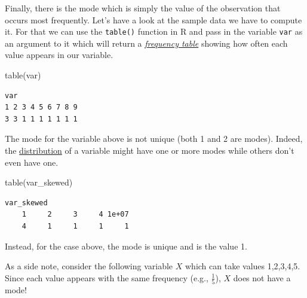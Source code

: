 \documentclass[
  letterpaper,
  DIV=11,
  numbers=noendperiod]{scrartcl}
\newenvironment{Shaded}{\begin{snugshade}}{\end{snugshade}}
\newcommand{\FunctionTok}[1]{\textcolor[rgb]{0.28,0.35,0.67}{#1}}
\newcommand{\NormalTok}[1]{\textcolor[rgb]{0.00,0.23,0.31}{#1}}
\begin{document}
Finally, there is the mode which is simply the value of the observation
that occurs most frequently. Let's have a look at the sample data we
have to compute it. For that we can use the \texttt{table()} function in
R and pass in the variable \texttt{var} as an argument to it which will
return a
\href{https://www.ncl.ac.uk/webtemplate/ask-assets/external/maths-resources/statistics/data-presentation/frequency-distribution-tables.html\#:~:text=A\%20frequency\%20table\%20is\%20a,qualitative\%20or\%20quantitative\%20discrete\%20data.}{\emph{frequency
table}} showing how often each value appears in our variable.

\begin{Shaded}
\begin{Highlighting}[]
\FunctionTok{table}\NormalTok{(var)}
\end{Highlighting}
\end{Shaded}

\begin{verbatim}
var
1 2 3 4 5 6 7 8 9 
3 3 1 1 1 1 1 1 1 
\end{verbatim}

The mode for the variable above is not unique (both 1 and 2 are modes).
Indeed, the
\href{https://aarongullickson.github.io/stat_book/the-distribution-of-a-variable.html}{distribution}
of a variable might have one or more modes while others don't even have
one.

\begin{Shaded}
\begin{Highlighting}[]
\FunctionTok{table}\NormalTok{(var\_skewed)}
\end{Highlighting}
\end{Shaded}

\begin{verbatim}
var_skewed
    1     2     3     4 1e+07 
    4     1     1     1     1 
\end{verbatim}

Instead, for the case above, the mode is unique and is the value 1.

\begin{tcolorbox}[enhanced jigsaw, colbacktitle=quarto-callout-note-color!10!white, coltitle=black, leftrule=.75mm, colback=white, colframe=quarto-callout-note-color-frame, rightrule=.15mm, opacitybacktitle=0.6, titlerule=0mm, arc=.35mm, toptitle=1mm, opacityback=0, bottomtitle=1mm, left=2mm, title=\textcolor{quarto-callout-note-color}{\faInfo}\hspace{0.5em}{Note}, bottomrule=.15mm, breakable, toprule=.15mm]

As a side note, consider the following variable \(X\) which can take
values 1,2,3,4,5. Since each value appears with the same frequency
(e.g., \(\frac{1}{5}\)), \(X\) does not have a mode!

\end{tcolorbox}
\end{document}
